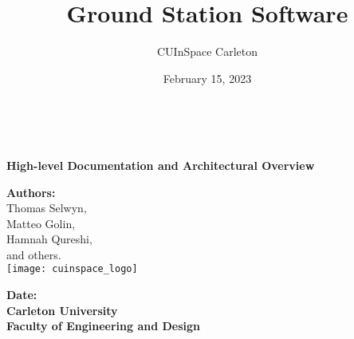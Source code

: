 \title{Ground Station Software}
\author{CUInSpace Carleton}
\date{February 15, 2023}

\makeatletter
    \begin{titlepage}
        \begin{center}

            {\fontsize{34}{50}\selectfont \bf \@title}\\ 
            \vspace{5cm}

            {\bf\Large High-level Documentation and Architectural Overview}\\
            \vspace{3cm}

            {\large \textbf{Authors:}}\\
            {\large Thomas Selwyn,}\\
            {\large Matteo Golin,}\\
            {\large Hamnah Qureshi,}\\
            {\large and others.}\\
            \texttt{[image: cuinspace\_logo]}
            
            {\large \textbf{Date:} \@date}\\
            {\large \textbf{Carleton University}}\\
            {\large \textbf{Faculty of Engineering and Design}}\\
        \end{center}
    \end{titlepage}
\makeatother